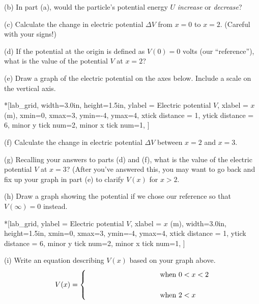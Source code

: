 (b) In part (a), would the particle's potential energy $U$ \textit{increase} or \textit{decrease}?
\answerspace{0.7in}

(c) Calculate the change in electric potential $\Delta V$ from $x=0$ to $x=2$. (Careful with your signs!)
\answerspace{0.9in}

(d) If the potential at the origin is defined as $V(0)=0$ volts (our ``reference''), what is the value of the potential $V$ at $x=2$?
\answerspace{0.7in}

\pagebreak
(e) Draw a graph of the electric potential on the axes below.  Include a scale on the vertical axis.

\begin{lab_axis}*[lab_grid,
	width={3.0in}, height={1.5in},
	ylabel = {Electric potential $V$},
	xlabel = {$x$ (m)},
	xmin=0, xmax=3,
	ymin=-4, ymax=4,
	xtick distance = 1,
	ytick distance = 6,
	minor y tick num=2,
	minor x tick num=1,
]
\end{lab_axis}

(f) Calculate the change in electric potential $\Delta V$ between $x=2$ and $x=3$.
\answerspace{0.5in}

(g) Recalling your answers to parts (d) and (f), what is the value of the electric potential $V$ at $x=3$?  (After you've answered this, you may want to go back and fix up your graph in part (e) to clarify $V(x)$ for $x>2$.
\answerspace{0.5in}

(h) Draw a graph showing the potential if we chose our reference so that $V(\infty)=0$ instead.  

\begin{lab_axis}*[lab_grid,
	ylabel = {Electric potential $V$},
	xlabel = {$x$ (m)},
	width={3.0in}, height={1.5in},
	xmin=0, xmax=3,
	ymin=-4, ymax=4,
	xtick distance = 1,
	ytick distance = 6,
	minor y tick num=2,
	minor x tick num=1,
]
\end{lab_axis}

(i) Write an equation describing $V(x)$ based on your graph above.
\begin{displaymath}
V(x) = \begin{cases}
        \rule{1.3in}{0in}  & \textrm{when } 0<x<2\\
        \\
        \hspace{1.3in} & \textrm{when }  2 < x
        \end{cases}
\end{displaymath}
\answerspace{0.1in}

